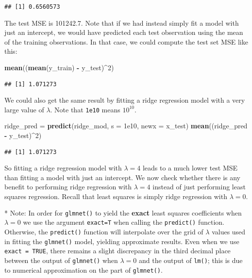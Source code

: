 \documentclass[]{article}
\newenvironment{Shaded}{\begin{snugshade}}{\end{snugshade}}
\newcommand{\KeywordTok}[1]{\textcolor[rgb]{0.13,0.29,0.53}{\textbf{#1}}}
\newcommand{\DataTypeTok}[1]{\textcolor[rgb]{0.13,0.29,0.53}{#1}}
\newcommand{\DecValTok}[1]{\textcolor[rgb]{0.00,0.00,0.81}{#1}}
\newcommand{\FloatTok}[1]{\textcolor[rgb]{0.00,0.00,0.81}{#1}}
\newcommand{\StringTok}[1]{\textcolor[rgb]{0.31,0.60,0.02}{#1}}
\newcommand{\OperatorTok}[1]{\textcolor[rgb]{0.81,0.36,0.00}{\textbf{#1}}}
\newcommand{\NormalTok}[1]{#1}
\begin{document}
\begin{verbatim}
## [1] 0.6560573
\end{verbatim}

The test MSE is 101242.7. Note that if we had instead simply fit a model
with just an intercept, we would have predicted each test observation
using the mean of the training observations. In that case, we could
compute the test set MSE like this:

\begin{Shaded}
\begin{Highlighting}[]
\KeywordTok{mean}\NormalTok{((}\KeywordTok{mean}\NormalTok{(y_train) }\OperatorTok{-}\StringTok{ }\NormalTok{y_test)}\OperatorTok{^}\DecValTok{2}\NormalTok{)}
\end{Highlighting}
\end{Shaded}

\begin{verbatim}
## [1] 1.071273
\end{verbatim}

We could also get the same result by fitting a ridge regression model
with a very large value of \(\lambda\). Note that \texttt{1e10} means
\(10^{10}\).

\begin{Shaded}
\begin{Highlighting}[]
\NormalTok{ridge_pred =}\StringTok{ }\KeywordTok{predict}\NormalTok{(ridge_mod, }\DataTypeTok{s =} \FloatTok{1e10}\NormalTok{, }\DataTypeTok{newx =}\NormalTok{ x_test)}
\KeywordTok{mean}\NormalTok{((ridge_pred }\OperatorTok{-}\StringTok{ }\NormalTok{y_test)}\OperatorTok{^}\DecValTok{2}\NormalTok{)}
\end{Highlighting}
\end{Shaded}

\begin{verbatim}
## [1] 1.071273
\end{verbatim}

So fitting a ridge regression model with \(\lambda = 4\) leads to a much
lower test MSE than fitting a model with just an intercept. We now check
whether there is any benefit to performing ridge regression with
\(\lambda = 4\) instead of just performing least squares regression.
Recall that least squares is simply ridge regression with
\(\lambda = 0\).

* Note: In order for \texttt{glmnet()} to yield the \textbf{exact} least
squares coefficients when \(\lambda = 0\) we use the argument
\texttt{exact=T} when calling the \texttt{predict()} function.
Otherwise, the \texttt{predict()} function will interpolate over the
grid of \(\lambda\) values used in fitting the \texttt{glmnet()} model,
yielding approximate results. Even when we use \texttt{exact\ =\ TRUE},
there remains a slight discrepancy in the third decimal place between
the output of \texttt{glmnet()} when \(\lambda = 0\) and the output of
\texttt{lm()}; this is due to numerical approximation on the part of
\texttt{glmnet()}.
\end{document}
